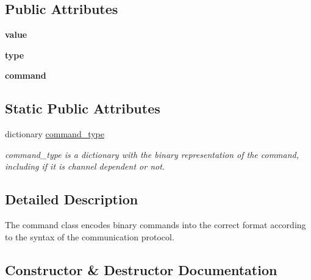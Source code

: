 \subsection*{Public Attributes}
\begin{DoxyCompactItemize}
\item 
\mbox{\label{classcommand_1_1command_af3d0d08baaceb9267e6175555560c287}} 
{\bfseries value}
\item 
\mbox{\label{classcommand_1_1command_aa4a718c78d7f588a2dac81ba8c5f5e35}} 
{\bfseries type}
\item 
\mbox{\label{classcommand_1_1command_a105a8e6d367d6286188ba52575b08d44}} 
{\bfseries command}
\end{DoxyCompactItemize}
\subsection*{Static Public Attributes}
\begin{DoxyCompactItemize}
\item 
dictionary \hyperlink{classcommand_1_1command_a5b96dc7d87263930faa4fa46cdd79412}{command\+\_\+type}
\begin{DoxyCompactList}\small\item\em command\+\_\+type is a dictionary with the binary representation of the command, including if it is channel dependent or not. \end{DoxyCompactList}\end{DoxyCompactItemize}


\subsection{Detailed Description}
The command class encodes binary commands into the correct format according to the syntax of the communication protocol. 

\subsection{Constructor \& Destructor Documentation}
\mbox{\label{classcommand_1_1command_a6743be48c00372cbe1dd3cfa23f6d183}} 
